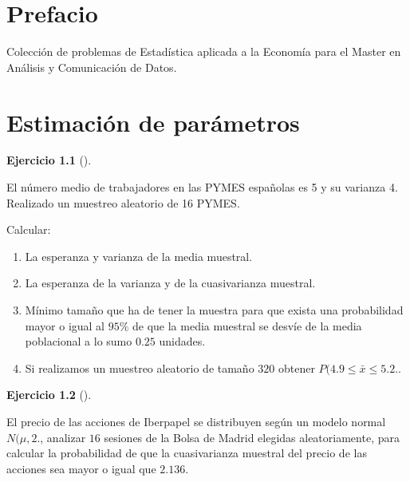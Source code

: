 \documentclass[
  a4paper,
]{scrreport}
\theoremstyle{definition}
\newtheorem{exercise}{Ejercicio}[chapter]
\theoremstyle{remark}
\begin{document}
\hypertarget{prefacio}{%
\chapter*{Prefacio}\label{prefacio}}


Colección de problemas de Estadística aplicada a la Economía para el
Master en Análisis y Comunicación de Datos.


\hypertarget{estimaciuxf3n-de-paruxe1metros}{%
\chapter{Estimación de
parámetros}\label{estimaciuxf3n-de-paruxe1metros}}

\begin{exercise}[]\protect\hypertarget{exr-distribucion-media-trabajadores-pymes}{}\label{exr-distribucion-media-trabajadores-pymes}

El número medio de trabajadores en las PYMES españolas es 5 y su
varianza 4. Realizado un muestreo aleatorio de 16 PYMES.

Calcular:

\begin{enumerate}
\def\labelenumi{\alph{enumi}.}
\item
  La esperanza y varianza de la media muestral.
\item
  La esperanza de la varianza y de la cuasivarianza muestral.
\item
  Mínimo tamaño que ha de tener la muestra para que exista una
  probabilidad mayor o igual al \(95\)\% de que la media muestral se
  desvíe de la media poblacional a lo sumo \(0.25\) unidades.
\item
  Si realizamos un muestreo aleatorio de tamaño \(320\) obtener
  \(P(4.9\leq \bar x \leq 5.2.\).
\end{enumerate}

\end{exercise}

\begin{exercise}[]\protect\hypertarget{exr-distribucion-cuasivarianza-iberpapel}{}\label{exr-distribucion-cuasivarianza-iberpapel}

El precio de las acciones de Iberpapel se distribuyen según un modelo
normal \(N(\mu, 2.\), analizar \(16\) sesiones de la Bolsa de Madrid
elegidas aleatoriamente, para calcular la probabilidad de que la
cuasivarianza muestral del precio de las acciones sea mayor o igual que
\(2.136\).

\end{exercise}
\end{document}
